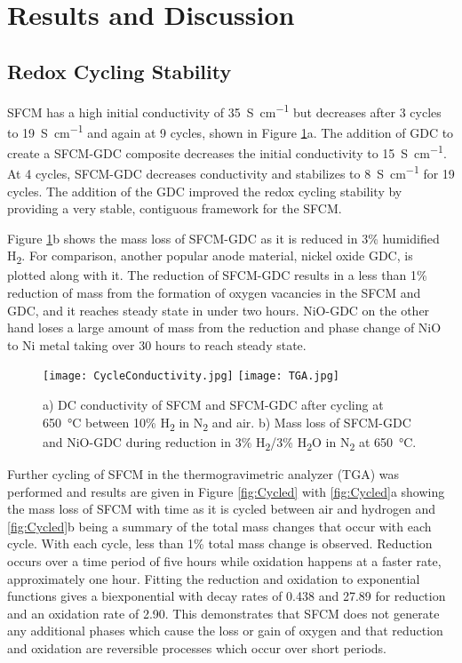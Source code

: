 \section{Results and Discussion}
    \subsection{Redox Cycling Stability}
        SFCM has a high initial conductivity of \SI{35}{S\per\centi\meter} but decreases after 3 cycles to \SI{19}{S\per\centi\meter} and again at 9 cycles, shown in Figure \ref{fig:TGA}a.
        The addition of GDC to create a SFCM-GDC composite decreases the initial conductivity to \SI{15}{S\per\centi\meter}.
        At 4 cycles, SFCM-GDC decreases conductivity and stabilizes to \SI{8}{S\per\centi\meter} for 19 cycles.
        The addition of the GDC improved the redox cycling stability by providing a very stable, contiguous framework for the SFCM.\cite{Mogensen2000,Duncan2006,Bishop2009}

        Figure \ref{fig:TGA}b shows the mass loss of SFCM-GDC as it is reduced in 3\% humidified H\textsubscript{2}.
        For comparison, another popular anode material, nickel oxide GDC, is plotted along with it.
        The reduction of SFCM-GDC results in a less than 1\% reduction of mass from the formation of oxygen vacancies in the SFCM and GDC, and it reaches steady state in under two hours.
        NiO-GDC on the other hand loses a large amount of mass from the reduction and phase change of NiO to Ni metal taking over 30 hours to reach steady state.

        \begin{figure}
          \texttt{[image: CycleConductivity.jpg]}
          \texttt{[image: TGA.jpg]}
          \caption{a) DC conductivity of SFCM and SFCM-GDC after cycling at \SI{650}{\celsius} between 10\% H\textsubscript{2} in N\textsubscript{2} and air. b) Mass loss of SFCM-GDC and NiO-GDC during reduction in 3\% H\textsubscript{2}/3\% H\textsubscript{2}O in N\textsubscript{2} at \SI{650}{\celsius}.}
          \label{fig:TGA}
        \end{figure}

        Further cycling of SFCM in the thermogravimetric analyzer (TGA) was performed and results are given in Figure \ref{fig:Cycled} with \ref{fig:Cycled}a showing the mass loss of SFCM with time as it is cycled between air and hydrogen and \ref{fig:Cycled}b being a summary of the total mass changes that occur with each cycle.
        With each cycle, less than 1\% total mass change is observed.
        Reduction occurs over a time period of five hours while oxidation happens at a faster rate, approximately one hour.
        Fitting the reduction and oxidation to exponential functions gives a biexponential with decay rates of 0.438 and 27.89 for reduction and an oxidation rate of 2.90.
        This demonstrates that SFCM does not generate any additional phases which cause the loss or gain of oxygen and that reduction and oxidation are reversible processes which occur over short periods.

